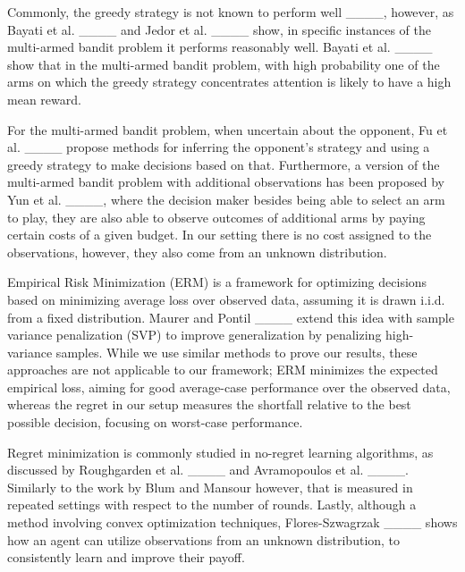 Commonly, the greedy strategy is not known to perform well ____, however, as Bayati et al. ____ and Jedor et al. ____ show, in specific instances of the multi-armed bandit problem it performs reasonably well. Bayati et al. ____ show that in the multi-armed bandit problem, with high probability one of the arms on which the greedy strategy concentrates attention is likely to have a high mean reward.

For the multi-armed bandit problem, when uncertain about the opponent, Fu et al. ____ propose methods for inferring the opponent's strategy and using a greedy strategy to make decisions based on that. 
Furthermore, a version of the multi-armed bandit problem with additional observations has been proposed by Yun et al. ____, where the decision maker besides being able to select an arm to play, they are also able to observe outcomes of additional arms by paying certain costs of a given budget. In our setting there is no cost assigned to the observations, however, they also come from an unknown distribution. 

Empirical Risk Minimization (ERM) is a framework for optimizing decisions based on minimizing average loss over observed data, assuming it is drawn i.i.d. from a fixed distribution. Maurer and Pontil ____ extend this idea with sample variance penalization (SVP) to improve generalization by penalizing high-variance samples. While we use similar methods to prove our results, these approaches are not applicable to our framework; ERM minimizes the expected empirical loss, aiming for good average-case performance over the observed data, whereas the regret in our setup measures the shortfall relative to the best possible decision, focusing on worst-case performance.

Regret minimization is commonly studied in no-regret learning algorithms, as discussed by Roughgarden et al. ____ and Avramopoulos et al. ____. Similarly to the work by Blum and Mansour however, that is measured in repeated settings with respect to the number of rounds. Lastly, although a method involving convex optimization techniques, Flores-Szwagrzak ____ shows how an agent can utilize observations from an unknown distribution, to consistently learn and improve their payoff.
